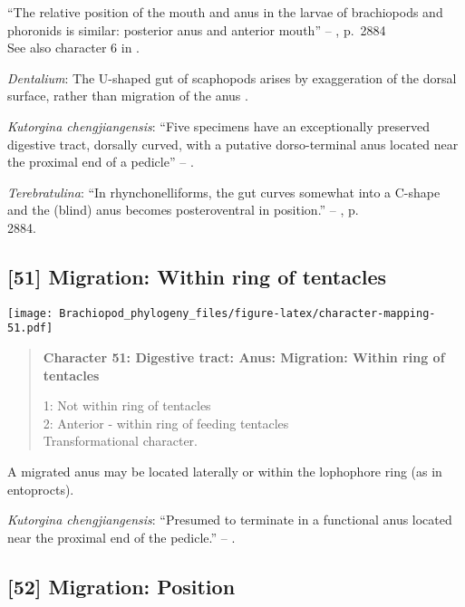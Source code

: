 \documentclass[openany]{book}
\theoremstyle{definition}
\theoremstyle{definition}
\theoremstyle{definition}
\theoremstyle{remark}
\begin{document}
``The relative position of the mouth and anus in the larvae of
brachiopods and phoronids is similar: posterior anus and anterior
mouth'' -- \citet{Williams2007Supplement}, p.~2884\\
See also character 6 in \citet{Haszprunar2008}.

\hypertarget{Dentalium-coding-50}{}
\emph{Dentalium}: The U-shaped gut of scaphopods arises by exaggeration
of the dorsal surface, rather than migration of the anus
\citep{Steiner1992}.

\hypertarget{Kutorgina_chengjiangensis-coding-50}{}
\emph{Kutorgina chengjiangensis}: ``Five specimens have an exceptionally
preserved digestive tract, dorsally curved, with a putative
dorso-terminal anus located near the proximal end of a pedicle'' --
\citet{Zhang2007Rhynchonelliformeanbrachiopods}.

\hypertarget{Terebratulina-coding-50}{}
\emph{Terebratulina}: ``In rhynchonelliforms, the gut curves somewhat
into a C-shape and the (blind) anus becomes posteroventral in
position.'' -- \citet{Williams2007Supplement}, p.\\
2884.

\subsection*{{[}51{]} Migration: Within ring of
tentacles}\label{migration-within-ring-of-tentacles}

\texttt{[image: Brachiopod\_phylogeny\_files/figure-latex/character-mapping-51.pdf]}

\begin{quote}
\textbf{Character 51: Digestive tract: Anus: Migration: Within ring of
tentacles}

1: Not within ring of tentacles\\
2: Anterior - within ring of feeding tentacles\\
Transformational character.
\end{quote}

A migrated anus may be located laterally or within the lophophore ring
(as in entoprocts).

\hypertarget{Kutorgina_chengjiangensis-coding-51}{}
\emph{Kutorgina chengjiangensis}: ``Presumed to terminate in a
functional anus located near the proximal end of the pedicle.'' --
\citet{Zhang2007Rhynchonelliformeanbrachiopods}.

\subsection*{{[}52{]} Migration: Position}\label{migration-position}
\end{document}
